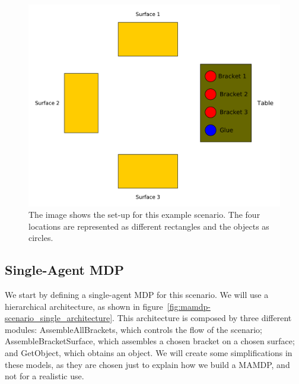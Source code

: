  \begin{figure}[ht!]
	\centering
	\includegraphics[scale=0.5]{img/coworker/mamdp/scenario.pdf}
	\caption[MAMDP example scenario]{The image shows the set-up for this example scenario. The four locations are represented as different rectangles and the objects as circles. }
	\label{fig:mamdp-mamdp_scenario}
\end{figure}

\subsection{Single-Agent MDP}

We start by defining a single-agent MDP for this scenario. We will use a hierarchical architecture, as shown in figure~\ref{fig:mamdp-scenario_single_architecture}. This architecture is composed by three different modules: AssembleAllBrackets, which controls the flow of the scenario; AssembleBracketSurface, which assembles a chosen bracket on a chosen surface; and GetObject, which obtains an object. We will create some simplifications in these models, as they are chosen just to explain how we build a MAMDP, and not for a realistic use.

